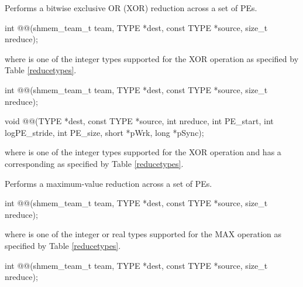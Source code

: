 \begin{apidefinition}
Performs a bitwise exclusive OR (XOR) reduction across a set of \acp{PE}.\newline

\begin{C11synopsis}
int @@(shmem_team_t team, TYPE *dest, const TYPE *source, size_t nreduce);
\end{C11synopsis}
where \TYPE{} is one of the integer types supported for the XOR operation as specified by Table \ref{reducetypes}.

\begin{Csynopsis}
\end{Csynopsis}
\begin{CsynopsisCol}
int @@(shmem_team_t team, TYPE *dest, const TYPE *source, size_t nreduce);
\end{CsynopsisCol}

\begin{DeprecateBlock}
\begin{CsynopsisCol}
void @@(TYPE *dest, const TYPE *source, int nreduce, int PE_start, int logPE_stride, int PE_size, short *pWrk, long *pSync);
\end{CsynopsisCol}
\end{DeprecateBlock}
where \TYPE{} is one of the integer types supported for the XOR operation and has a corresponding \TYPENAME{} as specified by Table \ref{reducetypes}.

Performs a maximum-value reduction across a set of \acp{PE}.\newline

\begin{C11synopsis}
int @@(shmem_team_t team, TYPE *dest, const TYPE *source, size_t nreduce);
\end{C11synopsis}
where \TYPE{} is one of the integer or real types supported for the MAX operation as specified by Table \ref{reducetypes}.

\begin{Csynopsis}
\end{Csynopsis}

\begin{CsynopsisCol}
int @@(shmem_team_t team, TYPE *dest, const TYPE *source, size_t nreduce);
\end{CsynopsisCol}


\end{apidefinition}
